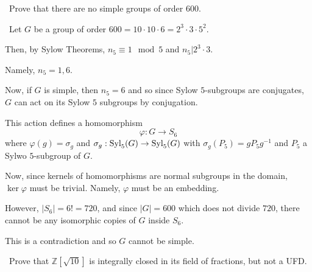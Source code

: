 \documentclass[12pt]{AlgebraQual}
\begin{document}
\begin{problem} $\,$
Prove that there are no simple groups of order $600.$
\end{problem}


\begin{solution}$\,$
Let $G$ be a group of order $600=10\cdot 10\cdot 6=2^3\cdot 3\cdot 5^2$.

Then, by Sylow Theorems, $n_5\equiv 1\mod5$ and $n_5|2^3\cdot 3$.

Namely, $n_5=1,6$.

Now, if $G$ is simple, then $n_5=6$ and so since Sylow $5$-subgroups are conjugates, $G$ can act on its Sylow $5$ subgroups by conjugation.

This action defines a homomorphism $$\varphi:G\to S_6$$ where $\varphi(g)=\sigma_g$ and $\sigma_g:\text{Syl}_5(G)\to\text{Syl}_5(G)$ with $\sigma_g(P_5)=gP_5g^{-1}$ and $P_5$ a Sylwo $5$-subgroup of $G$.

Now, since kernels of homomorphisms are normal subgroups in the domain, $\ker\varphi$ must be trivial. Namely, $\varphi$ must be an embedding.

However, $|S_6|=6!=720$, and since $|G|=600$ which does not divide $720$, there cannot be any isomorphic copies of $G$ inside $S_6$.

This is a contradiction and so $G$ cannot be simple.
\end{solution}
\newpage



\begin{problem} $\,$
Prove that $\mathbb{Z}[\sqrt{10}]$ is integrally closed in its field of fractions, but not a UFD.
\end{problem}
\end{document}
